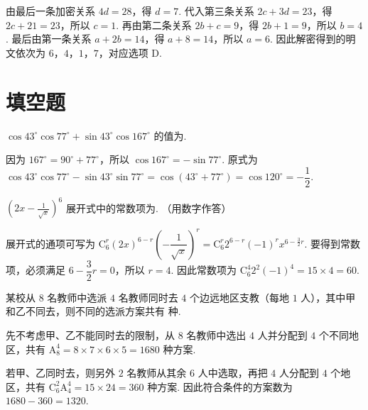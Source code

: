 
\begin{solution}
由最后一条加密关系 \(4d=28\)，得 \(d=7\). 代入第三条关系 \(2c+3d=23\)，得 \(2c+21=23\)，所以 \(c=1\). 再由第二条关系 \(2b+c=9\)，得 \(2b+1=9\)，所以 \(b=4\). 最后由第一条关系 \(a+2b=14\)，得 \(a+8=14\)，所以 \(a=6\). 因此解密得到的明文依次为 \(6\)，\(4\)，\(1\)，\(7\)，对应选项 D.
\end{solution}

\section{填空题}
\begin{problem}
\(\cos 43^{\circ}\cos 77^{\circ} + \sin 43^{\circ}\cos 167^{\circ}\) 的值为\fillinblank{}.
\end{problem}


\begin{solution}
因为 \(167^{\circ}=90^{\circ}+77^{\circ}\)，所以 \(\cos167^{\circ}=-\sin77^{\circ}\). 原式为 \(\cos43^{\circ}\cos77^{\circ}-\sin43^{\circ}\sin77^{\circ}=\cos(43^{\circ}+77^{\circ})=\cos120^{\circ}=-\dfrac12\).
\end{solution}

\begin{problem}
\(\left(2x - \frac{1}{\sqrt{x}}\right)^6\) 展开式中的常数项为\fillinblank{}. （用数字作答）
\end{problem}


\begin{solution}
展开式的通项可写为 \(\mathrm C_{6}^{r}(2x)^{6-r}\left(-\dfrac{1}{\sqrt{x}}\right)^{r}=\mathrm C_{6}^{r}2^{6-r}(-1)^{r}x^{6-\frac32r}\). 要得到常数项，必须满足 \(6-\dfrac32r=0\)，所以 \(r=4\). 因此常数项为 \(\mathrm C_{6}^{4}2^{2}(-1)^{4}=15\times4=60\).
\end{solution}

\begin{problem}
某校从 \(8\) 名教师中选派 \(4\) 名教师同时去 \(4\) 个边远地区支教（每地 \(1\) 人），其中甲和乙不同去，则不同的选派方案共有\fillinblank{} 种.
\end{problem}


\begin{solution}
先不考虑甲、乙不能同时去的限制，从 \(8\) 名教师中选出 \(4\) 人并分配到 \(4\) 个不同地区，共有 \(\mathrm A_{8}^{4}=8\times7\times6\times5=1680\) 种方案.

若甲、乙同时去，则另外 \(2\) 名教师从其余 \(6\) 人中选取，再把 \(4\) 人分配到 \(4\) 个地区，共有 \(\mathrm C_{6}^{2}\mathrm A_{4}^{4}=15\times24=360\) 种方案. 因此符合条件的方案数为 \(1680-360=1320\).
\end{solution}

